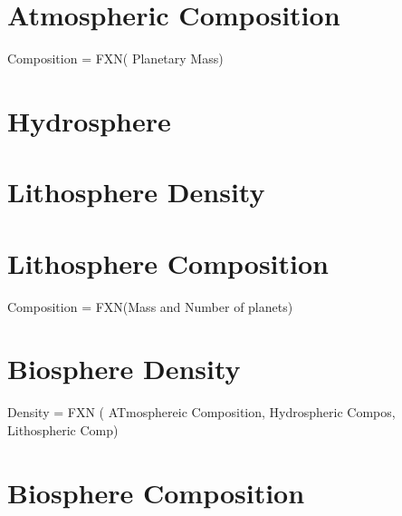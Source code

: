 \section{Atmospheric Composition}
Composition = FXN( Planetary Mass)
\section{Hydrosphere}
\section{Lithosphere Density}
\section{Lithosphere Composition}
Composition = FXN(Mass and Number of planets)
\section{Biosphere Density    }
Density = FXN ( ATmosphereic Composition, Hydrospheric Compos, 
Lithospheric Comp)
\section{Biosphere Composition}


